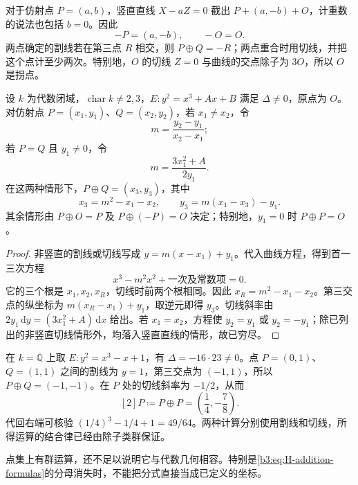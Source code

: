 对于仿射点 \(P=(a,b)\)，竖直直线 \(X-aZ=0\) 截出 \(P+(a,-b)+O\)，计重数的说法也包括 \(b=0\)。因此
\[
	-P=(a,-b),\qquad -O=O.
\]
两点确定的割线若在第三点 \(R\) 相交，则 \(P\oplus Q=-R\)；两点重合时用切线，并把这个点计至少两次。特别地，\(O\) 的切线 \(Z=0\) 与曲线的交点除子为 \(3O\)，所以 \(O\) 是拐点。

\begin{proposition}[割线与切线公式]\label{b3:prop:H-chord-tangent-formulas}
	设 \(k\) 为代数闭域，\(\operatorname{char}k\ne2,3\)，\(E:y^2=x^3+Ax+B\) 满足 \(\Delta\ne0\)，原点为 \(O\)。对仿射点 \(P=(x_1,y_1)\)、\(Q=(x_2,y_2)\)，若 \(x_1\ne x_2\)，令
	\[
		m=\frac{y_2-y_1}{x_2-x_1};
	\]
	若 \(P=Q\) 且 \(y_1\ne0\)，令
	\[
		m=\frac{3x_1^2+A}{2y_1}.
	\]
	在这两种情形下，\(P\oplus Q=(x_3,y_3)\)，其中
	\begin{equation}\label{b3:eq:H-addition-formulas}
		x_3=m^2-x_1-x_2,\qquad
		y_3=m(x_1-x_3)-y_1.
	\end{equation}
	其余情形由 \(P\oplus O=P\) 及 \(P\oplus(-P)=O\) 决定；特别地，\(y_1=0\) 时 \(P\oplus P=O\)。
\end{proposition}
\begin{proof}
	非竖直的割线或切线写成 \(y=m(x-x_1)+y_1\)。代入曲线方程，得到首一三次方程
	\[
		x^3-m^2x^2+\text{一次及常数项}=0.
	\]
	它的三个根是 \(x_1,x_2,x_R\)，切线时前两个根相同。因此 \(x_R=m^2-x_1-x_2\)。第三交点的纵坐标为 \(m(x_R-x_1)+y_1\)，取逆元即得 \(y_3\)。切线斜率由 \(2y_1\,\mathrm{d}y=(3x_1^2+A)\,\mathrm{d}x\) 给出。若 \(x_1=x_2\)，方程使 \(y_2=y_1\) 或 \(y_2=-y_1\)；除已列出的非竖直切线情形外，均落入竖直直线的情形，故已穷尽。
\end{proof}

\begin{example}\label{b3:exm:H-point-addition}
	在 \(k=\overline{\mathbb Q}\) 上取 \(E:y^2=x^3-x+1\)，有 \(\Delta=-16\cdot23\ne0\)。点 \(P=(0,1)\)、\(Q=(1,1)\) 之间的割线为 \(y=1\)，第三交点为 \((-1,1)\)，所以 \(P\oplus Q=(-1,-1)\)。在 \(P\) 处的切线斜率为 \(-1/2\)，从而
	\[
		[2]P\coloneqq P\oplus P
		=\left(\frac14,-\frac78\right).
	\]
	代回右端可核验 \((1/4)^3-1/4+1=49/64\)。两种计算分别使用割线和切线，所得运算的结合律已经由除子类群保证。
\end{example}

点集上有群运算，还不足以说明它与代数几何相容。特别是\eqref{b3:eq:H-addition-formulas}的分母消失时，不能把分式直接当成已定义的坐标。

